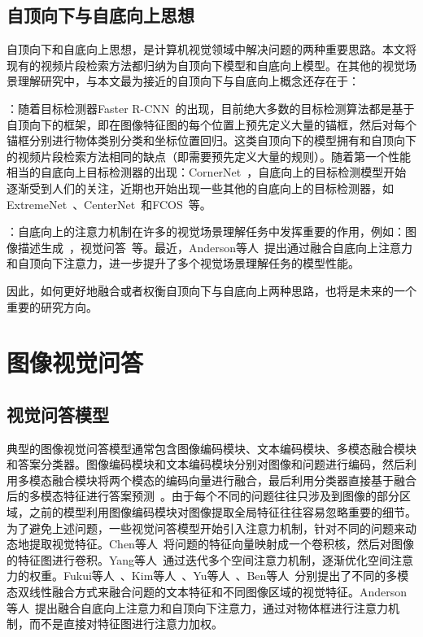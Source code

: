 \subsection{自顶向下与自底向上思想}
自顶向下和自底向上思想，是计算机视觉领域中解决问题的两种重要思路。本文将现有的视频片段检索方法都归纳为自顶向下模型和自底向上模型。在其他的视觉场景理解研究中，与本文最为接近的自顶向下与自底向上概念还存在于：

\textbf{}：随着目标检测器Faster R-CNN~\cite{ren2015faster}的出现，目前绝大多数的目标检测算法都是基于自顶向下的框架，即在图像特征图的每个位置上预先定义大量的锚框，然后对每个锚框分别进行物体类别分类和坐标位置回归。这类自顶向下的模型拥有和自顶向下的视频片段检索方法相同的缺点（即需要预先定义大量的规则）。随着第一个性能相当的自底向上目标检测器的出现：CornerNet~\cite{law2018cornernet}，自底向上的目标检测模型开始逐渐受到人们的关注，近期也开始出现一些其他的自底向上的目标检测器，如ExtremeNet~\cite{zhou2019bottom}、CenterNet~\cite{zhou2019objects,duan2019centernet}和FCOS~\cite{tian2019fcos}等。

\textbf{}：自底向上的注意力机制在许多的视觉场景理解任务中发挥重要的作用，例如：图像描述生成~\cite{xu2015show,chen2017sca}，视觉问答~\cite{xu2016ask,ye2017video}等。最近，Anderson等人~\cite{anderson2018bottom}提出通过融合自底向上注意力和自顶向下注意力，进一步提升了多个视觉场景理解任务的模型性能。

因此，如何更好地融合或者权衡自顶向下与自底向上两种思路，也将是未来的一个重要的研究方向。


\section{图像视觉问答}

\subsection{视觉问答模型}

典型的图像视觉问答模型通常包含图像编码模块、文本编码模块、多模态融合模块和答案分类器。图像编码模块和文本编码模块分别对图像和问题进行编码，然后利用多模态融合模块将两个模态的编码向量进行融合，最后利用分类器直接基于融合后的多模态特征进行答案预测~\cite{zhou2015simple,antol2015vqa,kim2016multimodal}。由于每个不同的问题往往只涉及到图像的部分区域，之前的模型利用图像编码模块对图像提取全局特征往往容易忽略重要的细节。为了避免上述问题，一些视觉问答模型开始引入注意力机制，针对不同的问题来动态地提取视觉特征。Chen等人~\cite{chen2016abc}将问题的特征向量映射成一个卷积核，然后对图像的特征图进行卷积。Yang等人~\cite{yang2016stacked}通过迭代多个空间注意力机制，逐渐优化空间注意力的权重。Fukui等人~\cite{fukui2016multimodal}、Kim等人~\cite{kim2017hadamard,kim2018bilinear}、Yu等人~\cite{yu2017multi,yu2018beyond}、Ben等人~\cite{ben2017mutan,ben2019block}分别提出了不同的多模态双线性融合方式来融合问题的文本特征和不同图像区域的视觉特征。Anderson等人~\cite{anderson2018bottom}提出融合自底向上注意力和自顶向下注意力，通过对物体框进行注意力机制，而不是直接对特征图进行注意力加权。

